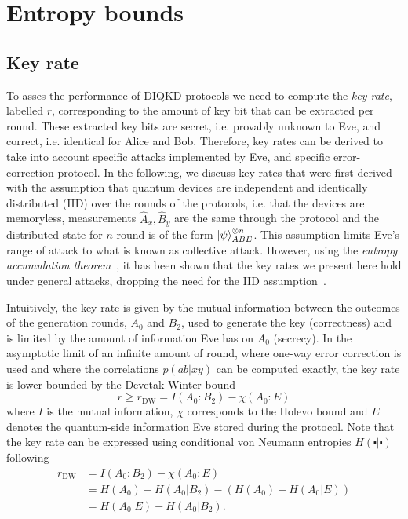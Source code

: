 \chapter{Entropy bounds}
\label{chap:entropybound}

\section{Key rate}

To asses the performance of DIQKD protocols we need to compute the \textit{key rate}, labelled $r$, corresponding to the amount of key bit that can be extracted per round.
These extracted key bits are secret, i.e. provably unknown to Eve, and correct, i.e. identical for Alice and Bob.
Therefore, key rates can be derived to take into account specific attacks implemented by Eve, and specific error-correction protocol.
In the following, we discuss key rates that were first derived with the assumption that quantum devices are independent and identically distributed (IID) over the rounds of the protocols, i.e. that the devices are memoryless, measurements $\hat{A}_x,\hat{B}_y$ are the same through the protocol and the distributed state for $n$-round is of the form $\ket{\psi}_{ABE}^{\otimes n}$.
This assumption limits Eve's range of attack to what is known as collective attack.
However, using the \textit{entropy accumulation theorem}~\cite{Dupuis2019,Dupuis2020}, it has been shown that the key rates we present here hold under general attacks, dropping the need for the IID assumption~\cite{ArnonFriedman2019}.

\medbreak

Intuitively, the key rate is given by the mutual information between the outcomes of the generation rounds, $A_0$ and $B_2$, used to generate the key (correctness) and is limited by the amount of information Eve has on $A_0$ (secrecy).
In the asymptotic limit of an infinite amount of round, where one-way error correction is used and where the correlations $p(ab|xy)$ can be computed exactly, the key rate is lower-bounded by the Devetak-Winter bound~\cite{Devetak2005}
\begin{equation}
	r \geq r_\mathrm{DW} = I(A_0 : B_2) - \chi(A_0 : E)
	\label{eq:Devetak-Winter}
\end{equation}
where $I$ is the mutual information, $\chi$ corresponds to the Holevo bound and $E$ denotes the quantum-side information Eve stored during the protocol.
Note that the key rate can be expressed using conditional von Neumann entropies $H(\centerdot|\centerdot)$ following
\begin{equation}
	\begin{split}
		r_\mathrm{DW} &= I(A_0 : B_2) - \chi(A_0 : E) \\
					  &= H(A_0)-H(A_0|B_2) - (H(A_0)- H(A_0|E)) \\
					  &= H(A_0|E) - H(A_0 | B_2).
	\end{split}
\end{equation}

